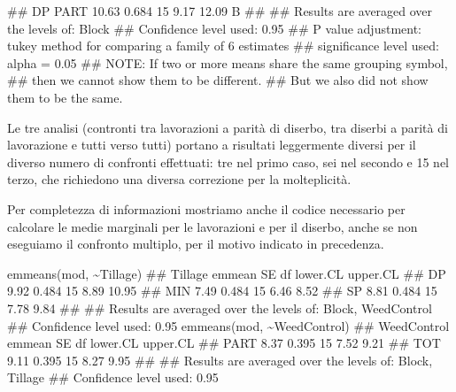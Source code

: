 \documentclass[a4paper,12pt,oneside]{book}
\newenvironment{Shaded}{\begin{snugshade}}{\end{snugshade}}
\newcommand{\SpecialCharTok}[1]{#1}
\newcommand{\DocumentationTok}[1]{#1}
\newcommand{\FunctionTok}[1]{#1}
\newcommand{\AlertTok}[1]{#1}
\newcommand{\NormalTok}[1]{#1}
\begin{document}
\begin{Shaded}
\begin{Highlighting}[]
\DocumentationTok{\#\#  DP      PART         10.63 0.684 15     9.17    12.09   B   }
\DocumentationTok{\#\# }
\DocumentationTok{\#\# Results are averaged over the levels of: Block }
\DocumentationTok{\#\# Confidence level used: 0.95 }
\DocumentationTok{\#\# P value adjustment: tukey method for comparing a family of 6 estimates }
\DocumentationTok{\#\# significance level used: alpha = 0.05 }
\DocumentationTok{\#\# }\AlertTok{NOTE}\DocumentationTok{: If two or more means share the same grouping symbol,}
\DocumentationTok{\#\#       then we cannot show them to be different.}
\DocumentationTok{\#\#       But we also did not show them to be the same.}
\end{Highlighting}
\end{Shaded}

Le tre analisi (contronti tra lavorazioni a parità di diserbo, tra diserbi a parità di lavorazione e tutti verso tutti) portano a risultati leggermente diversi per il diverso numero di confronti effettuati: tre nel primo caso, sei nel secondo e 15 nel terzo, che richiedono una diversa correzione per la molteplicità.

Per completezza di informazioni mostriamo anche il codice necessario per calcolare le medie marginali per le lavorazioni e per il diserbo, anche se non eseguiamo il confronto multiplo, per il motivo indicato in precedenza.

\begin{Shaded}
\begin{Highlighting}[]
\FunctionTok{emmeans}\NormalTok{(mod, }\SpecialCharTok{\textasciitilde{}}\NormalTok{Tillage)}
\DocumentationTok{\#\#  Tillage emmean    SE df lower.CL upper.CL}
\DocumentationTok{\#\#  DP        9.92 0.484 15     8.89    10.95}
\DocumentationTok{\#\#  MIN       7.49 0.484 15     6.46     8.52}
\DocumentationTok{\#\#  SP        8.81 0.484 15     7.78     9.84}
\DocumentationTok{\#\# }
\DocumentationTok{\#\# Results are averaged over the levels of: Block, WeedControl }
\DocumentationTok{\#\# Confidence level used: 0.95}
\FunctionTok{emmeans}\NormalTok{(mod, }\SpecialCharTok{\textasciitilde{}}\NormalTok{WeedControl)}
\DocumentationTok{\#\#  WeedControl emmean    SE df lower.CL upper.CL}
\DocumentationTok{\#\#  PART          8.37 0.395 15     7.52     9.21}
\DocumentationTok{\#\#  TOT           9.11 0.395 15     8.27     9.95}
\DocumentationTok{\#\# }
\DocumentationTok{\#\# Results are averaged over the levels of: Block, Tillage }
\DocumentationTok{\#\# Confidence level used: 0.95}
\end{Highlighting}
\end{Shaded}
\end{document}
